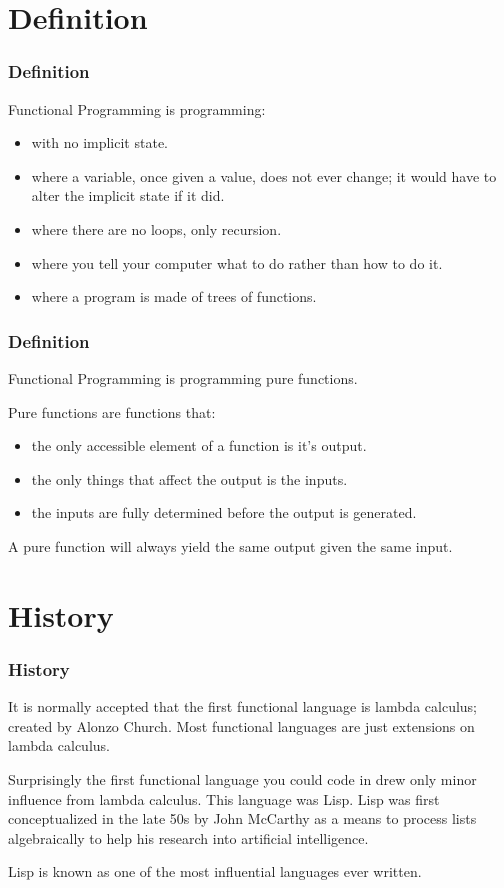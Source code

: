 \documentclass[presentation.tex]{subfiles}
\begin{document}
\section{Definition}
\begin{frame}
  \frametitle{Definition}
  Functional Programming is programming:
  \begin{itemize}
    \item with no implicit state.
    \item where a variable, once given a value, does not ever change; it would have to alter the implicit state if it did.
    \item where there are no loops, only recursion.
    \item where you tell your computer what to do rather than how to do it.
    \item where a program is made of trees of functions.
  \end{itemize}
\end{frame}


\begin{frame}
  \frametitle{Definition}
  Functional Programming is programming pure functions.

  \vspace{\baselineskip}
  Pure functions are functions that:
  \begin{itemize}
    \item the only accessible element of a function is it's output.
    \item the only things that affect the output is the inputs.
    \item the inputs are fully determined before the output is generated.
  \end{itemize}

  \vspace{\baselineskip}
  A pure function will always yield the same output given the same input.
\end{frame}

\section{History}
\begin{frame}
  \frametitle{History}
  It is normally accepted that the first functional language is lambda calculus; created by Alonzo Church. Most functional languages are just extensions on lambda calculus.

  \vspace{\baselineskip}
  Surprisingly the first functional language you could code in drew only minor influence from lambda calculus. This language was Lisp. Lisp was first conceptualized in the late 50s by John McCarthy as a means to process lists algebraically to help his research into artificial intelligence.

  \vspace{\baselineskip}
  Lisp is known as one of the most influential languages ever written.
\end{frame}
\end{document}
